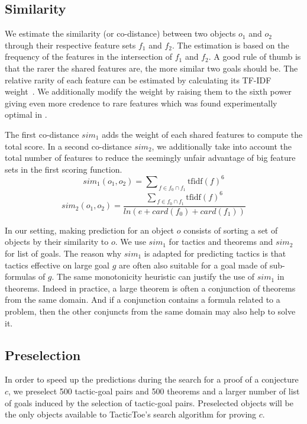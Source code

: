 \documentclass[runningheads,a4paper,draft]{svjour3}
\def\tactictoe{\textsf{TacticToe}\xspace}
\begin{document}
\subsection{Similarity}\label{sec:predictions}
We estimate the similarity (or co-distance) between two objects $o_1$ and $o_2$
through their respective feature sets $f_1$ and $f_2$.
The estimation is based on the frequency of the features in the intersection of
$f_1$ and $f_2$. A good rule of thumb is that the rarer the shared features
are, the more similar two goals should be. The relative rarity of each feature
can be estimated by calculating its TF-IDF weight~\cite{Jones72astatistical}.
We additionally modify the weight by raising them to the sixth power giving
even more credence
to rare features which was found experimentally optimal in \cite{ckju-pxtp13}.

The first co-distance $sim_1$ adds the weight of each shared
features to compute the total score.
In a second co-distance $sim_2$, we additionally take into account
the total number of features to reduce the seemingly unfair advantage of big
feature sets in the first scoring function.
\[sim_1 (o_1, o_2) = {\sum\nolimits_{\,f \in f_0 \cap
f_1}{\text{tfidf}(f)^{6}}}\]
\[sim_2 (o_1, o_2) = \frac{{\sum\nolimits_{\,f \in f_0 \cap
f_1}{\text{tfidf}(f)^{6}}}}
{ln (e + card(f_0) + card(f_1))}\]

In our setting, making prediction for an object $o$ consists of sorting a set
of objects by their similarity to $o$. We use $sim_1$ for tactics and theorems
and $sim_2$ for list of goals. The reason why $sim_1$ is adapted for
predicting tactics is that tactics effective on large goal $g$ are often also
suitable for a goal made of sub-formulas of $g$. The same monotonicity
heuristic can justify the use of $sim_1$ in theorems. Indeed in practice, a
large theorem is often a conjunction of theorems from the same domain.
And if a conjunction contains a formula related to a problem, then the other
conjuncts from the same domain may also help to solve it.

\subsection{Preselection}\label{sec:dependencies}

In order to speed up the predictions during the search for a proof of a
conjecture $c$, we preselect 500 tactic-goal pairs and 500 theorems and a 
larger number of list of goals induced by the selection of tactic-goal pairs. 
Preselected objects will 
be the only objects available to \tactictoe's search algorithm for proving $c$.
\end{document}
